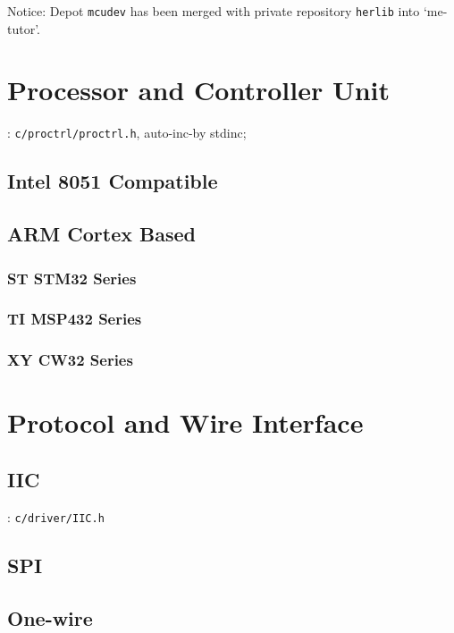 Notice: Depot \verb`mcudev` has been merged with private repository \verb`herlib` into `me-tutor'.

\section{Processor and Controller Unit}
:
\verb`c/proctrl/proctrl.h`, auto-inc-by stdinc;


\subsection{Intel 8051 Compatible}

\subsection{ARM Cortex Based}

\subsubsection{ST STM32 Series}

\subsubsection{TI MSP432 Series}

\subsubsection{XY CW32 Series}

\section{Protocol and Wire Interface}

\subsection{IIC}

: \verb`c/driver/IIC.h`

\subsection{SPI}

\subsection{One-wire}

